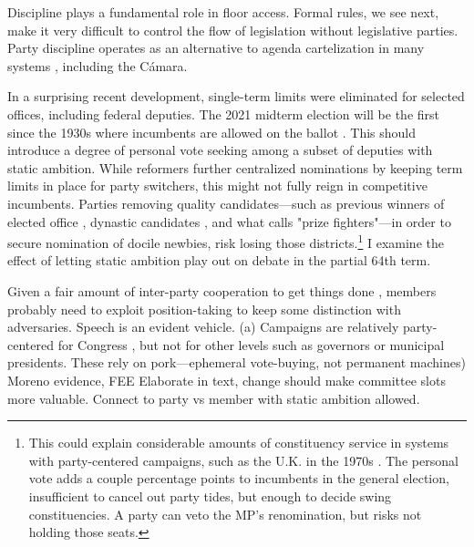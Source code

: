 \documentclass[letter,12pt]{article}
\begin{document}
Discipline plays a fundamental role in floor access. Formal rules, we see next, make it very difficult to control the flow of legislation without legislative parties. Party discipline operates as an alternative to agenda cartelization in many systems \citep{prata.2006}, including the Cámara. 

In a surprising recent development, single-term limits were eliminated for selected offices, including federal deputies. The 2021 midterm election will be the first since the 1930s where incumbents are allowed on the ballot \citep[see][ for details]{magarInstReel.2017}. This should introduce a degree of personal vote seeking among a subset of deputies with static ambition. While reformers further centralized nominations by keeping term limits in place for party switchers, this might not fully reign in competitive incumbents. Parties removing quality candidates---such as previous winners of elected office \citep{jacobson.1997}, dynastic candidates \citep{enriquez-dinastias2018itam}, and what \citet{zallerprizeFighters} calls "prize fighters"---in order to secure nomination of docile newbies, risk losing those districts.\footnote{This could explain considerable amounts of constituency service in systems with party-centered campaigns, such as the U.K. in the 1970s \citep{cain.etal.1987}. The personal vote adds a couple percentage points to incumbents in the general election, insufficient to cancel out party tides, but enough to decide swing constituencies. A party can veto the MP's renomination, but risks not holding those seats.} I examine the effect of letting static ambition play out on debate in the partial 64th term. 

Given a fair amount of inter-party cooperation to get things done \citep{casarSinMay2013}, members probably need to exploit position-taking to keep some distinction with adversaries. Speech is an evident vehicle. 
(a) Campaigns are relatively party-centered for Congress \citep{langston.nd}, but not for other levels such as governors or municipal presidents. These rely on pork---ephemeral vote-buying, not permanent machines) Moreno evidence, FEE
Elaborate in text, change should make committee slots more valuable. Connect to party vs member with static ambition allowed. 
\end{document}
